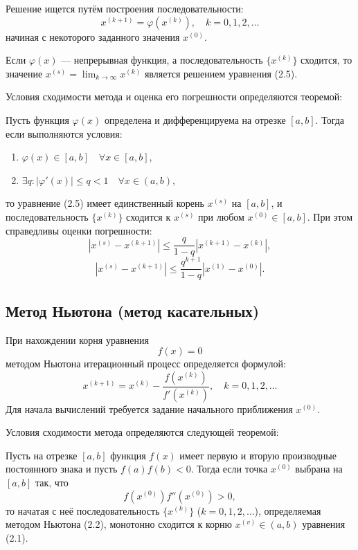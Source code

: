 Решение ищется путём построения последовательности:
\[ x^{(k+1)} = \varphi(x^{(k)}), \quad k = 0, 1, 2, \ldots \tag{2.6} \]
начиная с некоторого заданного значения \( x^{(0)} \). 

Если \( \varphi(x) \) — непрерывная функция, а последовательность \( \{x^{(k)}\} \) сходится, то значение \( x^{(s)} = \lim_{k \to \infty} x^{(k)} \) является решением уравнения (2.5).

Условия сходимости метода и оценка его погрешности определяются теоремой:

\begin{theorem}[2.3]
Пусть функция \( \varphi(x) \) определена и дифференцируема на отрезке \([a, b]\). Тогда если выполняются условия:
\begin{enumerate}
    \item \( \varphi(x) \in [a, b] \quad \forall x \in [a, b] \),
    \item \( \exists q : |\varphi'(x)| \leq q < 1 \quad \forall x \in (a, b) \),
\end{enumerate}
то уравнение (2.5) имеет единственный корень \( x^{(s)} \) на \([a, b]\), и последовательность \( \{x^{(k)}\} \) сходится к \( x^{(s)} \) при любом \( x^{(0)} \in [a, b] \). При этом справедливы оценки погрешности:
\[
\left| x^{(s)} - x^{(k+1)} \right| \leq \frac{q}{1-q} \left| x^{(k+1)} - x^{(k)} \right|,
\]
\[
\left| x^{(s)} - x^{(k+1)} \right| \leq \frac{q^{k+1}}{1-q} \left| x^{(1)} - x^{(0)} \right|. \tag{2.7}
\]
\end{theorem}

\subsection*{Метод Ньютона (метод касательных)}
При нахождении корня уравнения 
\[ f(x) = 0 \tag{2.1} \]
методом Ньютона итерационный процесс определяется формулой:
\[
x^{(k+1)} = x^{(k)} - \frac{f(x^{(k)})}{f'(x^{(k)})}, \quad k = 0,1,2,\ldots \tag{2.2}
\]
Для начала вычислений требуется задание начального приближения \( x^{(0)} \).

Условия сходимости метода определяются следующей теоремой:

\begin{theorem}[2.2]
Пусть на отрезке \([a,b]\) функция \( f(x) \) имеет первую и вторую производные постоянного знака и пусть \( f(a)f(b) < 0 \). Тогда если точка \( x^{(0)} \) выбрана на \([a,b]\) так, что
\[
f(x^{(0)})f''(x^{(0)}) > 0, \tag{2.3}
\]
то начатая с неё последовательность \( \{x^{(k)}\} \) (\( k=0,1,2,\ldots \)), определяемая методом Ньютона (2.2), монотонно сходится к корню \( x^{(v)} \in (a,b) \) уравнения (2.1).
\end{theorem}

